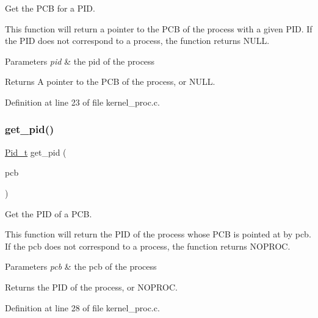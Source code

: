 Get the P\+CB for a P\+ID. 

This function will return a pointer to the P\+CB of the process with a given P\+ID. If the P\+ID does not correspond to a process, the function returns {\ttfamily N\+U\+LL}.


\begin{DoxyParams}{Parameters}
{\em pid} & the pid of the process \\
\hline
\end{DoxyParams}
\begin{DoxyReturn}{Returns}
A pointer to the P\+CB of the process, or N\+U\+LL. 
\end{DoxyReturn}


Definition at line 23 of file kernel\+\_\+proc.\+c.

\mbox{\label{group__proc_ga110e884cb053244b18d1058751a78cfe}} 
\subsubsection{\texorpdfstring{get\+\_\+pid()}{get\_pid()}}
{\footnotesize\ttfamily \hyperlink{group__syscalls_gafac07f3170763932fac97b6eab2c3984}{Pid\+\_\+t} get\+\_\+pid (\begin{DoxyParamCaption}\item[{\hyperlink{group__proc_gadf327f09ee935cf1734c14e8849f0421}{P\+CB} $\ast$}]{pcb }\end{DoxyParamCaption})}



Get the P\+ID of a P\+CB. 

This function will return the P\+ID of the process whose P\+CB is pointed at by {\ttfamily pcb}. If the pcb does not correspond to a process, the function returns {\ttfamily N\+O\+P\+R\+OC}.


\begin{DoxyParams}{Parameters}
{\em pcb} & the pcb of the process \\
\hline
\end{DoxyParams}
\begin{DoxyReturn}{Returns}
the P\+ID of the process, or N\+O\+P\+R\+OC. 
\end{DoxyReturn}


Definition at line 28 of file kernel\+\_\+proc.\+c.

\mbox{\label{group__proc_ga82948cbeb57bb0b6e15d1f14f06a2db3}} 
